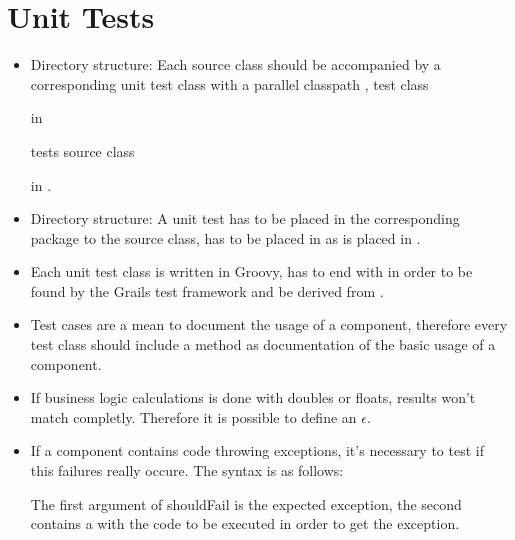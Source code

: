 \section{Unit Tests}
\begin{itemize}
	\item Directory structure: Each source class should be accompanied by a corresponding unit 
		test class with a parallel classpath \eg, test class 
		
		 in 
		
		tests source class
		
		 in 
		.
		
	\item Directory structure: A unit test has to be placed in the corresponding package to the source class, \eg {} has to be placed in  as  is placed in .
	\item Each unit test class is written in Groovy, has to end with  in order to be found by the Grails test framework and be derived from .
	\item Test cases are a mean to document the usage of a component, therefore every test class should include a method  as documentation of the basic usage of a component.
	\item If business logic calculations is done with doubles or floats, results won't match completly. Therefore it is possible to define an $\epsilon$.
	
	\item If a component contains code throwing exceptions, it's necessary to test if this failures really occure. The syntax is as follows:
	
		
	The first argument of shouldFail is the expected exception, the second contains a \GroovyClosure{} with the code to be executed in order to get the exception.
	

\end{itemize}
